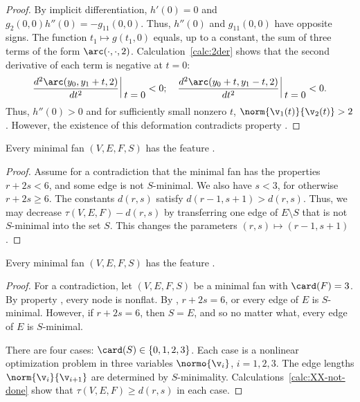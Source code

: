 \begin{proof}
By implicit differentiation, $h'(0) = 0$ and $g_2(0,0) h''(0) =
-g_{11}(0,0)$.  Thus, $h''(0)$ and $g_{11}(0,0)$ have opposite signs.
The function $t_1\mapsto g(t_1,0)$ equals, up to a constant, the sum
of three terms of the form $\arc(\cdot,\cdot,2)$.
Calculation~\ref{calc:2der} shows that the second derivative of each
term  is negative at $t=0$:
\begin{equation}\label{eqn:arc''}
\def\vt{\vrule_{\relax{\raisebox{-0.55em}{\ensuremath{\displaystyle{~t=0}}}}}}
\frac{d^2 \arc(y_0,y_1+t,2)}{d t^2}\,\vt < 0;\quad
\dfrac{d^2 \arc(y_0+t,y_1-t,2)}{d t^2}\,\vt < 0.
\end{equation}  
Thus, $h''(0)>0$
and for sufficiently small nonzero $t$, $\norm{\v_1(t)}{\v_2(t)}>2$.
However, the existence of this deformation contradicts property
.
\end{proof}


\begin{lemma}[] 
Every minimal fan $(V,E,F,S)$ has the feature .
\end{lemma}

\begin{proof} Assume for a contradiction that the minimal fan has the properties  $r+2s < 6$,
and some edge is not $S$-minimal.
We also have $s<3$, for otherwise  $r+2s\ge 6$.
The constants $d(r,s)$ satisfy $d(r-1,s+1) > d(r,s)$.  Thus, we may decrease $\tau(V,E,F)-d(r,s)$
by transferring one edge of $E\setminus S$ that is not $S$-minimal into the set $S$.
This changes the parameters $(r,s)\mapsto (r-1,s+1)$.
\end{proof}

\begin{lemma}[]\label{lemma:triangle-free}
Every minimal fan $(V,E,F,S)$ has the feature .
\end{lemma}

\begin{proof}
For a contradiction, let $(V,E,F,S)$ be a minimal fan with $\card(F)=3$.  
By property , every node is nonflat.  By ,  $r+2s=6$,
or every edge of $E$ is $S$-minimal.  However, if  $r+2s=6$, then $S=E$, and so no matter
what, every edge of $E$ is $S$-minimal.

There are four cases: $\card(S)\in\{0,1,2,3\}$.  Each case is a nonlinear optimization problem in
three variables $\normo{\v_i}$, $i=1,2,3$.  The edge lengths $\norm{\v_i}{\v_{i+1}}$ are determined
by $S$-minimality.   Calculations~\ref{calc:XX-not-done} show that $\tau(V,E,F)\ge d(r,s)$ in
each case.
\end{proof}



